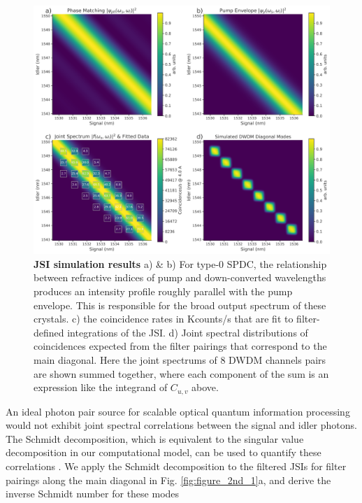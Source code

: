 \documentclass[11pt]{caltech_thesis} %
\begin{document}
\hypertarget{fig:jsi_sim}{%
\begin{figure}
\centering
\includegraphics[width=1\textwidth,height=\textheight]{./chapter_05/figs/JSI_sim_results_light.pdf}
\caption[{JSI simulation results}]{\textbf{JSI simulation results} a) \& b) For type-0 SPDC, the relationship between refractive indices of pump and down-converted wavelengths produces an intensity profile roughly parallel with the pump envelope. This is responsible for the broad output spectrum of these crystals. c) the coincidence rates in Kcounts/s that are fit to filter-defined integrations of the JSI. d) Joint spectral distributions of coincidences expected from the filter pairings that correspond to the main diagonal. Here the joint spectrums of 8 DWDM channels pairs are shown summed together, where each component of the sum is an expression like the integrand of $C_{u,v}$ above.}
\label{fig:jsi_sim}
\end{figure}
}

An ideal photon pair source for scalable optical quantum information processing would not exhibit joint spectral correlations between the signal and idler photons. The Schmidt decomposition, which is equivalent to the singular value decomposition in our computational model, can be used to quantify these correlations \autocite{ZielnickiKwiat2018SPDCmodel}. We apply the Schmidt decomposition to the filtered JSIs for filter pairings along the main diagonal in Fig. \ref{fig:figure_2nd_1}a, and derive the inverse Schmidt number for these modes
\end{document}
